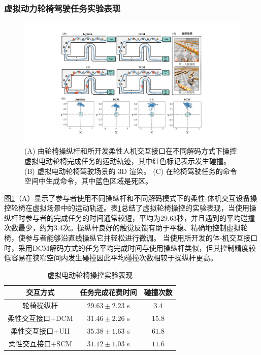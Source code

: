 \subsubsection{虚拟动力轮椅驾驶任务实验表现}     
  
\begin{figure}[htb]
    \includegraphics[width=1\textwidth]{figures/3-Fig-15.pdf}
    \caption{(A) 由轮椅操纵杆和所开发柔性人机交互接口在不同解码方式下操控虚拟电动轮椅完成任务的运动轨迹，其中红色标记表示发生碰撞。(B) 虚拟电动轮椅驾驶场景的 3D 渲染。 (C) 在轮椅驾驶任务的命令空间中生成命令，其中蓝色区域是死区。}
    \label{fig:3-15}
\end{figure}  

图\ref{fig:3-15}（A）显示了参与者使用不同操纵杆和不同解码模式下的柔性-体机交互设备操控轮椅在虚拟场景中的运动轨迹。表\ref{tab3-2}总结了虚拟轮椅操控的实验表现，当使用操纵杆时参与者的完成任务的时间通常较短，平均为29.63秒，并且遇到的平均碰撞次数最少，约为3.4次。操纵杆良好的触觉反馈有助于平稳、精确地控制虚拟轮椅，使参与者能够沿直线操纵它并轻松进行微调。 当使用所开发的体-机交互接口时，采用DCM解码方式的任务平均完成时间与使用操纵杆类似，但其控制精度较低容易在狭窄空间内发生碰撞因此平均碰撞次数相较于操纵杆更高。  

\begin{table}[htb]
 \centering
 \caption{虚拟电动轮椅操控实验表现}
 \setlength{\tabcolsep}{5pt}
 \begin{tabular}{c c c}
 \hline\hline
  交互方式 & 任务完成花费时间 & 碰撞次数  \\  
 \hline
 轮椅操纵杆&     $29.63\pm 2.23$      s&        $3.4$         \\ 
 柔性交互接口+DCM&        $31.46\pm 2.26$        s&        $15.8$         \\ 
 柔性交互接口+UII&        $35.38\pm 1.63$        s&        $61.8$         \\ 
 柔性交互接口+SCM&        $31.12\pm 1.03$        s&        $11.6$         \\  
 \hline\hline
 \end{tabular}
 \label{tab3-2}
\end{table}     

